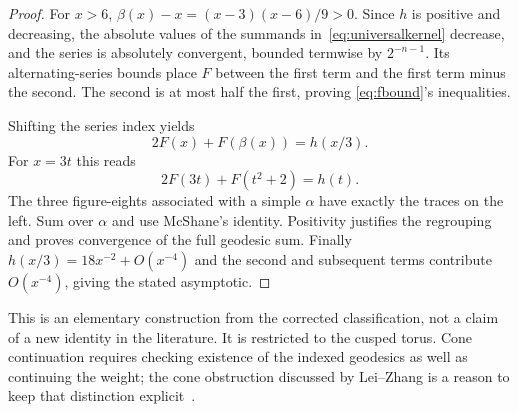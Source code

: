 \begin{proof}
For $x>6$,
$\beta(x)-x=(x-3)(x-6)/9>0$. Since $h$ is positive and decreasing,
the absolute values of the summands in~\eqref{eq:universalkernel} decrease,
and the series is absolutely convergent, bounded termwise by $2^{-n-1}$.
Its alternating-series bounds place $F$ between the first term and the
first term minus the second. The second is at most half the first, proving
\eqref{eq:fbound}'s inequalities.

Shifting the series index yields
\[
 2F(x)+F(\beta(x))=h(x/3).
\]
For $x=3t$ this reads
\begin{equation}
 2F(3t)+F(t^2+2)=h(t).
 \label{eq:kernelrelation}
\end{equation}
The three figure-eights associated with a simple $\alpha$ have exactly
the traces on the left. Sum over $\alpha$ and use McShane's identity.
Positivity justifies the regrouping and proves convergence of the full
geodesic sum. Finally $h(x/3)=18x^{-2}+O(x^{-4})$ and the second and
subsequent terms contribute $O(x^{-4})$, giving the stated asymptotic.
\end{proof}

This is an elementary construction from the corrected classification,
not a claim of a new identity in the literature. It is restricted to the
cusped torus. Cone continuation requires checking existence of the indexed
geodesics as well as continuing the weight; the cone obstruction discussed
by Lei--Zhang is a reason to keep that distinction explicit~\cite{LeiZhang}.

